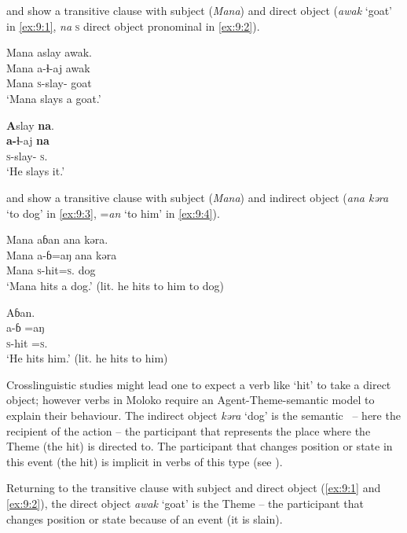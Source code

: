  and  show a transitive clause with subject (\textit{Mana}) and direct object (\textit{awak} ‘goat’ in \ref{ex:9:1}, \textit{na} \textsc{s} direct object pronominal in \ref{ex:9:2}).

\ea \label{ex:9:1}
Mana  aslay  awak.\\
\gll  Mana a{}-ɬ{}-aj    awak\\
      Mana  \textsc{s}-slay{}-{\CL}  goat\\
\glt  ‘Mana slays a goat.’ 
\z

\ea \label{ex:9:2}
\textbf{A}slay  \textbf{na}.\\
\gll  \textbf{a-}ɬ{}-aj      \textbf{na}\\
      \textsc{s}-slay{}-{\CL}      \textsc{s}.{\DO}\\
\glt  ‘He slays it.’ 
\z

 and  show a transitive clause with subject (\textit{Mana}) and indirect object (\textit{ana kəra} ‘to dog’ in \ref{ex:9:3}, =\textit{an} ‘to him’ in \ref{ex:9:4}). 

\ea \label{ex:9:3}
Mana  aɓan  ana  kəra. \\
\gll  Mana   a-ɓ=aŋ    ana   kəra \\
      Mana  \textsc{s}-hit=\textsc{s}.{\IO}  {\DAT} dog\\
\glt  ‘Mana hits a dog.’ (lit. he hits to him to dog)
\z

\ea \label{ex:9:4}
Aɓan. \\
\gll  a-ɓ    =aŋ \\
      \textsc{s}-hit  =\textsc{s}.{\IO}\\
\glt  ‘He hits him.’ (lit. he hits to him)
\z

Crosslinguistic studies might lead one to expect a verb like ‘hit’ to take a direct object; however verbs in Moloko require an Agent-Theme-\LOC semantic model to explain their behaviour. The indirect object \textit{kəra} ‘dog’ is the semantic \LOC \ -- here the recipient of the action -- the participant that represents the place where the Theme (the hit) is directed to. The participant that changes position or state in this event (the hit) is implicit in verbs of this type (see ). 

Returning to the transitive clause with subject and direct object (\ref{ex:9:1} and \ref{ex:9:2}), the direct object \textit{awak} ‘goat’ is the Theme -- the participant that changes position or state because of an event (it is slain). 

